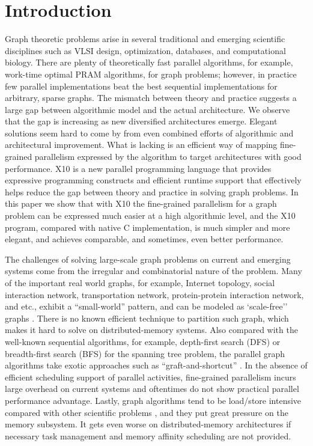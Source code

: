
\section{Introduction}
\label{s:intr}

 Graph theoretic problems arise in several traditional and emerging scientific disciplines such as VLSI design, optimization, databases, and computational biology. There are plenty of theoretically fast parallel algorithms, for example, work-time optimal PRAM algorithms, for graph problems; however, in
 practice few parallel implementations beat the best sequential implementations for arbitrary, sparse
 graphs. The mismatch between theory and practice suggests a large gap between algorithmic model and the actual architecture. We observe that the gap is increasing as new diversified architectures emerge. Elegant solutions seem hard to come by from even combined efforts of algorithmic and architectural improvement. What is lacking is an efficient way of mapping fine-grained parallelism expressed by the algorithm to target architectures with good performance. X10 is a new parallel programming language that provides expressive programming constructs and efficient runtime support that effectively helps reduce the gap between theory and practice in solving graph problems. In this paper we show that with X10 the fine-grained parallelism for a graph problem can be expressed much easier at a high algorithmic level, and the X10 program, compared with native C implementation, is much simpler and more elegant, and achieves comparable, and sometimes, even better performance. 

 The challenges of solving large-scale graph problems on current and emerging systems come from the irregular and combinatorial nature of the problem. Many of the important real world graphs, for example, Internet topology, social interaction network, transportation network, protein-protein interaction network, and etc., exhibit a ``small-world'' pattern, and can be modeled as `scale-free'' graphs \cite{CZF04}. There is no known efficient technique to partition such graph, which makes it hard to solve on distributed-memory systems. Also compared with the well-known sequential algorithms, for example, depth-first search (DFS) or breadth-first search (BFS) for the spanning tree problem, the parallel graph algorithms take exotic approaches such as ``graft-and-shortcut'' \cite{SV82}. In the absence of efficient scheduling support of parallel activities, fine-grained parallelism incurs large overhead on current systems and oftentimes do not show practical parallel performance advantage. Lastly, graph algorithms tend to be load/store intensive compared with other scientific problems \cite{G06}, and they put great pressure on the memory subsystem. It gets even worse on distributed-memory architectures if necessary task management and memory affinity scheduling are not provided.  
 
